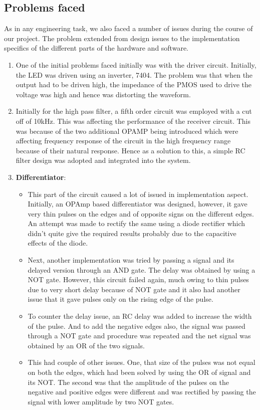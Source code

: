 \documentclass{article}
\begin{document}
\subsection{Problems faced}
 As in any engineering task, we also faced a number of issues during the course of our project. The problem extended from design issues to the implementation specifics of the different parts of the hardware and software. 
\begin{enumerate}
\item One of the initial problems faced initially was with the driver circuit. Initially, the LED was driven using an inverter, 7404. The problem was that when the output had to be driven high, the impedance of the PMOS used to drive the voltage was high and hence was distorting the waveform.
\item Initially for the high pass filter, a fifth order circuit was employed with a cut off of 10kHz. This was affecting the performance of the receiver circuit. This was because of the two additional OPAMP being introduced which were affecting frequency response of the circuit in the high frequency range because of their natural response. Hence as a solution to this, a simple RC filter design was adopted and integrated into the system.
\item \textbf{Differentiator}:
  \begin{itemize}
  \item This part of the circuit caused a lot of issued in implementation aspect. Initially, an OPAmp based differentiator was designed, however, it gave very thin pulses on the edges and of opposite signs on the different edges. An attempt was made to rectify the same using a diode rectifier which didn’t quite give the required results probably due to the capacitive effects of the diode.
  \item Next, another implementation was tried by passing a signal and its delayed version through an AND gate. The delay was obtained by using a NOT gate. However, this circuit failed again, much owing to thin pulses due to very short delay because of NOT gate and it also had another issue that it gave pulses only on the rising edge of the pulse.
  \item To counter the delay issue, an RC delay was added to increase the width of the pulse. And to add the negative edges also, the signal was passed through a NOT gate and procedure was repeated and the net signal was obtained by an OR of the two signals.
  \item This had couple of other issues. One, that size of the pulses was not equal on both the edges, which had been solved by using the OR of signal and its NOT. The second was that the amplitude of the pulses on the negative and positive edges were different and was rectified by passing the signal with lower amplitude by two NOT gates.

\end{itemize}
\end{enumerate}
\end{document}

